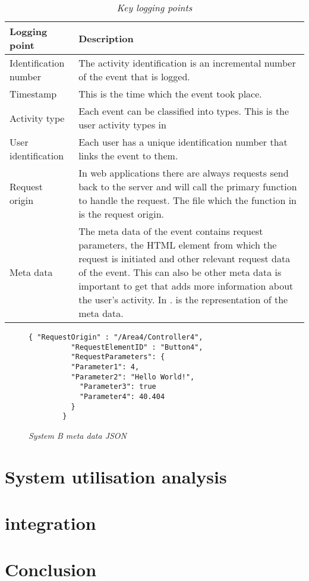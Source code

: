 \begin{table}[!htb]
	\centering
	\small
	\caption[Key logging points]
	{\textit{Key logging points}}
	\label{tbl:Ch2_KeyLogging_Points}
	\begin{tabularx}{\textwidth}{|l|X|}
		\hline \textbf{Logging point} & \textbf{Description} \\
		\hline Identification number & The activity identification is an incremental number of the event that is logged.\\
		\hline Timestamp & This is the time which the event took place.\\
		\hline Activity type & Each event can be classified into types. This is the user activity types in \Cref{tbl:Ch2_User_ActivityTypes} \\
		\hline User identification & Each user has a unique identification number that links the event to them. \\
		\hline Request origin & In web applications there are always requests send back to the server and will call the primary function to handle the request. The file which the function in is the request origin. \\
		\hline Meta data & The meta data of the event contains request parameters, the HTML element from which the request is initiated and other relevant request data of the event. This can also be other meta data is important to get that adds more information about the user's activity. In \Cref{fig:Ch2_Metadata_Json_Example}. is the representation of the meta data. \\
		\hline
	\end{tabularx}
\end{table}

\begin{figure}[!htb]
	\centering
	\begin{lstlisting}[style=json] 
		{ "RequestOrigin" : "/Area4/Controller4",
		  "RequestElementID" : "Button4",
		  "RequestParameters": {
		  "Parameter1": 4,
		  "Parameter2": "Hello World!",
			"Parameter3": true
			"Parameter4": 40.404
		  }		
		}
	\end{lstlisting}
	\caption[System B meta data JSON]
	{\textit{System B meta data JSON}}\label{fig:Ch2_Metadata_Json_Example}
\end{figure}

\section{System utilisation analysis}

\section{integration}

\section{Conclusion}